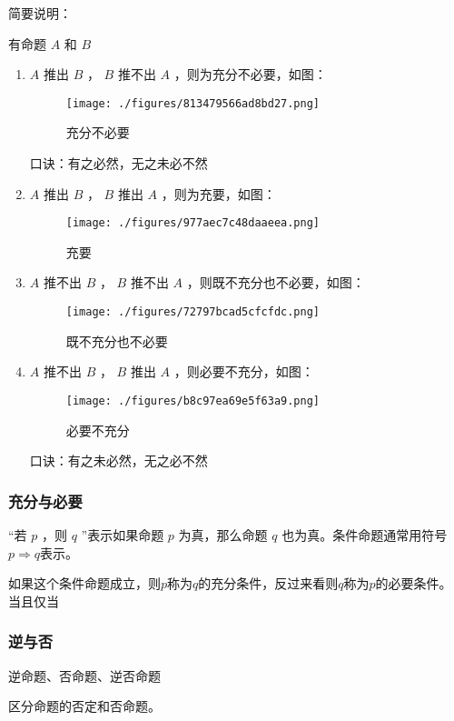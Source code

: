 简要说明：

有命题 $A$ 和 $B$ 
\begin{enumerate}
\item $A$ 推出 $B$ ， $B$ 推不出 $A$ ，则为充分不必要，如图：
\begin{figure}[ht]
\centering
\texttt{[image: ./figures/813479566ad8bd27.png]}
\caption{充分不必要} \label{fig_SufCnd_2}
\end{figure}
口诀：有之必然，无之未必不然
\item $A$ 推出 $B$ ， $B$ 推出 $A$ ，则为充要，如图：\begin{figure}[ht]
\centering
\texttt{[image: ./figures/977aec7c48daaeea.png]}
\caption{充要} \label{fig_SufCnd_3}
\end{figure}
\item $A$ 推不出 $B$ ， $B$ 推不出 $A$ ，则既不充分也不必要，如图：\begin{figure}[ht]
\centering
\texttt{[image: ./figures/72797bcad5cfcfdc.png]}
\caption{既不充分也不必要} \label{fig_SufCnd_4}
\end{figure}
\item $A$ 推不出 $B$ ， $B$ 推出 $A$ ，则必要不充分，如图：\begin{figure}[ht]
\centering
\texttt{[image: ./figures/b8c97ea69e5f63a9.png]}
\caption{必要不充分} \label{fig_SufCnd_5}
\end{figure}
口诀：有之未必然，无之必不然
\end {enumerate}


\subsubsection{充分与必要}

“若 $p$ ，则 $q$ ”表示如果命题 $p$ 为真，那么命题 $q$ 也为真。条件命题通常用符号$p\Rightarrow q$表示。

如果这个条件命题成立，则$p$称为$q$的充分条件，反过来看则$q$称为$p$的必要条件。
当且仅当


\subsubsection{逆与否}

逆命题、否命题、逆否命题

区分命题的否定和否命题。
